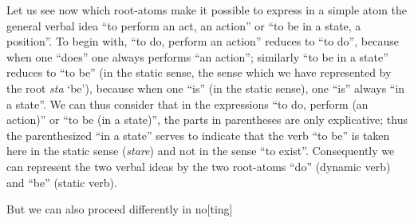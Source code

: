\begin{sloppypar}
{  Let us see now which root-atoms make it possible to express in a
  simple atom the general verbal idea ``to perform an act, an action''
  or ``to be in a state, a position''.  To begin with, ``to do,
  perform an action'' reduces to ``to do'', because when one ``does''
  one always performs ``an action''; similarly ``to be in a state''
  reduces to ``to be'' (in the static sense, the sense which we have
  represented by the root \emph{sta} `be'), because when one ``is''
  (in the static sense), one ``is'' always ``in a state''. We can thus
  consider that in the expressions ``to do, perform (an action)'' or
  ``to be (in a state)'', the parts in parentheses are only
  explicative; thus the parenthesized ``in a state'' serves to
  indicate that the verb ``to be'' is taken here in the static sense
  (\emph{stare}) and not in the sense ``to exist''.  Consequently we
  can represent the two verbal ideas by the two root-atoms ``do''
  (dynamic verb) and ``be'' (static verb).

  But we can also proceed differently in no{[ting]} }


\end{sloppypar}
